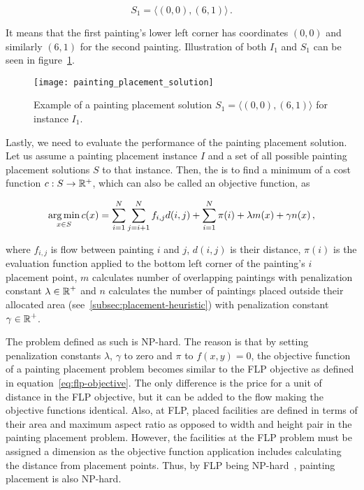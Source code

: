 \[
    S_1 = \langle (0,0), (6,1) \rangle \,.
\]

It means that the first painting's lower left corner has coordinates $(0,0)$
and similarly $(6,1)$ for the second painting.
Illustration of both $I_1$ and $S_1$ can be seen in figure~\ref{fig:painting-placement-solution}.

\begin{figure}
    \texttt{[image: painting\_placement\_solution]}
    \caption[Example of a painting placement solution]{Example of a painting placement solution $S_1 = \langle (0,0), (6,1) \rangle$ for instance $I_1$.}
    \label{fig:painting-placement-solution}
\end{figure}

\newpage

Lastly, we need to evaluate the performance of the painting placement solution.
Let us assume a painting placement instance $I$ and a set of all possible painting placement solutions $S$ to that instance.
Then, the  is to find a minimum of a cost function $c: S \to \operatorname*{\mathbb{R}^+}$,
which can also be called an objective function, as


\begin{equation}
    \operatorname*{arg\,min}_{x \in S} c(x) = \sum\limits_{i=1}^N\sum\limits_{j=i+1}^N f_{i,j}d(i, j) + \sum\limits_{i=1}^N \pi(i) + \lambda m(x) + \gamma n(x) \,,
    \label{eq:objective}
\end{equation}

where $f_{i,j}$ is flow between painting $i$ and $j$, $d(i,j)$ is their distance,
$\pi(i)$ is the evaluation function applied to the bottom left corner of the painting's $i$  placement point,
$m$ calculates number of overlapping paintings with penalization constant $\lambda \in \operatorname*{\mathbb{R}}^+$
and $n$ calculates the number of paintings placed outside their allocated area (see~\ref{subsec:placement-heuristic})
with penalization constant $\gamma \in \operatorname*{\mathbb{R}}^+$.

The problem defined as such is NP-hard.
The reason is that by setting penalization constants $\lambda$, $\gamma$ to zero and $\pi$ to $f(x,y) = 0$,
the objective function of a painting placement problem becomes similar to the FLP objective as defined in equation~\ref{eq:flp-objective}.
The only difference is the price for a unit of distance in the FLP objective, but it can be added to the flow making the objective functions identical.
Also, at FLP, placed facilities are defined in terms of their area and maximum aspect ratio as opposed to width and height pair in the painting placement problem.
However, the facilities at the FLP problem must be assigned a dimension as the objective function application includes calculating the distance from placement points.
Thus, by FLP being NP-hard~\cite{liuMultiobjectiveParticleSwarm2018, goncalvesBiasedRandomkeyGenetic2015, friedrichIntegratedSlicingTree2018}, painting placement is also NP-hard.
